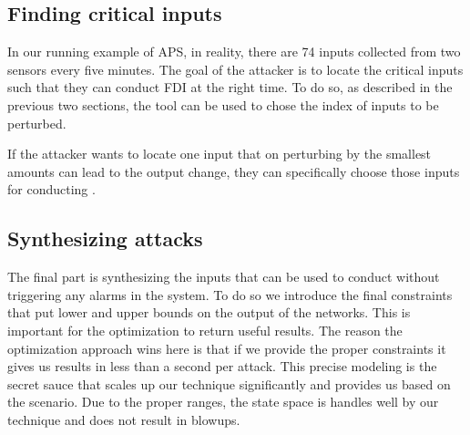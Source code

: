 \subsection{Finding critical inputs}
In our running example of APS, in reality, there are 74 inputs collected from two sensors every five minutes. The goal of the attacker is to locate the critical inputs such that they can conduct FDI at the right time. To do so, as described in the previous two sections, the tool can be used to chose the index of inputs to be perturbed. 

If the attacker wants to locate one input that on perturbing by the smallest amounts can lead to the output change, they can specifically choose those inputs for conducting \attack.

\label{section:cost function}
\subsection{Synthesizing attacks}
The final part is synthesizing the inputs that can be used to conduct \attack without triggering any alarms in the system. To do so we introduce the final constraints that put lower and upper bounds on the output of the networks. This is important for the optimization to return useful results. The reason the optimization approach wins here is that if we provide the proper constraints it gives us results in less than a second per attack. This precise modeling is the secret sauce that scales up our technique significantly and provides us \attack based on the scenario. Due to the proper ranges, the state space is handles well by our technique and does not result in blowups. 


